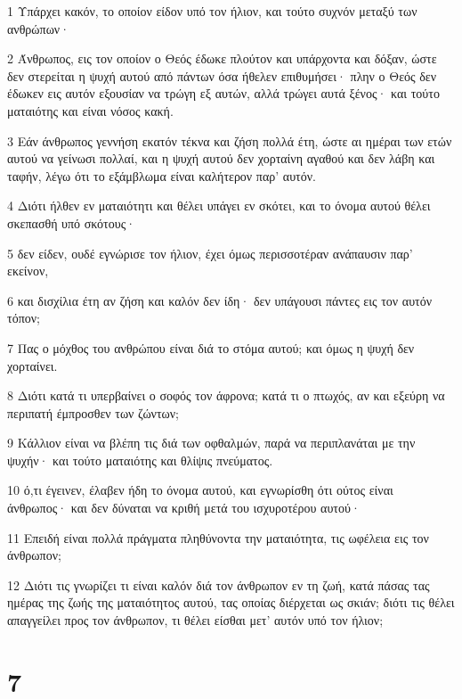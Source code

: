 \par 1 Υπάρχει κακόν, το οποίον είδον υπό τον ήλιον, και τούτο συχνόν μεταξύ των ανθρώπων·
\par 2 Άνθρωπος, εις τον οποίον ο Θεός έδωκε πλούτον και υπάρχοντα και δόξαν, ώστε δεν στερείται η ψυχή αυτού από πάντων όσα ήθελεν επιθυμήσει· πλην ο Θεός δεν έδωκεν εις αυτόν εξουσίαν να τρώγη εξ αυτών, αλλά τρώγει αυτά ξένος· και τούτο ματαιότης και είναι νόσος κακή.
\par 3 Εάν άνθρωπος γεννήση εκατόν τέκνα και ζήση πολλά έτη, ώστε αι ημέραι των ετών αυτού να γείνωσι πολλαί, και η ψυχή αυτού δεν χορταίνη αγαθού και δεν λάβη και ταφήν, λέγω ότι το εξάμβλωμα είναι καλήτερον παρ' αυτόν.
\par 4 Διότι ήλθεν εν ματαιότητι και θέλει υπάγει εν σκότει, και το όνομα αυτού θέλει σκεπασθή υπό σκότους·
\par 5 δεν είδεν, ουδέ εγνώρισε τον ήλιον, έχει όμως περισσοτέραν ανάπαυσιν παρ' εκείνον,
\par 6 και δισχίλια έτη αν ζήση και καλόν δεν ίδη· δεν υπάγουσι πάντες εις τον αυτόν τόπον;
\par 7 Πας ο μόχθος του ανθρώπου είναι διά το στόμα αυτού; και όμως η ψυχή δεν χορταίνει.
\par 8 Διότι κατά τι υπερβαίνει ο σοφός τον άφρονα; κατά τι ο πτωχός, αν και εξεύρη να περιπατή έμπροσθεν των ζώντων;
\par 9 Κάλλιον είναι να βλέπη τις διά των οφθαλμών, παρά να περιπλανάται με την ψυχήν· και τούτο ματαιότης και θλίψις πνεύματος.
\par 10 ό,τι έγεινεν, έλαβεν ήδη το όνομα αυτού, και εγνωρίσθη ότι ούτος είναι άνθρωπος· και δεν δύναται να κριθή μετά του ισχυροτέρου αυτού·
\par 11 Επειδή είναι πολλά πράγματα πληθύνοντα την ματαιότητα, τις ωφέλεια εις τον άνθρωπον;
\par 12 Διότι τις γνωρίζει τι είναι καλόν διά τον άνθρωπον εν τη ζωή, κατά πάσας τας ημέρας της ζωής της ματαιότητος αυτού, τας οποίας διέρχεται ως σκιάν; διότι τις θέλει απαγγείλει προς τον άνθρωπον, τι θέλει είσθαι μετ' αυτόν υπό τον ήλιον;

\chapter{7}

